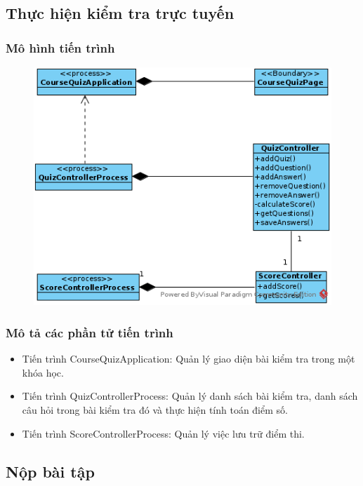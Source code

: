 \documentclass[./../main.tex]{subfiles}
\begin{document}
\subsection{Thực hiện kiểm tra trực tuyến}

\subsubsection{Mô hình tiến trình}

\begin{figure}[H]
	\centering
	\includegraphics[width=\linewidth]{./images/pv_take_test.png}
\end{figure}

\subsubsection{Mô tả các phần tử tiến trình}
\begin{itemize}
	\item Tiến trình CourseQuizApplication: Quản lý giao diện bài kiểm tra trong một khóa học.
	\item Tiến trình QuizControllerProcess: Quản lý danh sách bài kiểm tra, danh sách câu hỏi trong bài kiểm tra đó và thực hiện tính toán điểm số.
	\item Tiến trình ScoreControllerProcess: Quản lý việc lưu trữ điểm thi.
	
\end{itemize}

\subsection{Nộp bài tập}
\end{document}
